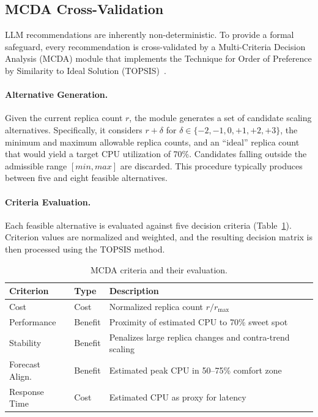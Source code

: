 \documentclass[sigconf]{acmart}
\begin{document}
\subsection{MCDA Cross-Validation}
\label{sec:mcda}

LLM recommendations are inherently non-deterministic.  To provide a formal safeguard, every recommendation is cross-validated by a Multi-Criteria Decision Analysis (MCDA) module that implements the Technique for Order of Preference by Similarity to Ideal Solution (TOPSIS)~\cite{hwang1981topsis}.

\paragraph{Alternative Generation.}
Given the current replica count $r$, the module generates a set of candidate scaling alternatives. Specifically, it considers $r + \delta$ for $\delta \in \{-2,-1,0,+1,+2,+3\}$, the minimum and maximum allowable replica counts, and an ``ideal'' replica count that would yield a target CPU utilization of 70\%. Candidates falling outside the admissible range $[\textit{min},\textit{max}]$ are discarded. This procedure typically produces between five and eight feasible alternatives.

\paragraph{Criteria Evaluation.}
Each feasible alternative is evaluated against five decision criteria (Table~\ref{tab:criteria}). Criterion values are normalized and weighted, and the resulting decision matrix is then processed using the TOPSIS method.


\begin{table}[t]
\caption{MCDA criteria and their evaluation.}
\label{tab:criteria}
\centering
\small
\begin{tabular}{@{}llp{3.8cm}@{}}
\toprule
\textbf{Criterion} & \textbf{Type} & \textbf{Description} \\
\midrule
Cost            & Cost    & Normalized replica count $r / r_{\max}$ \\
Performance     & Benefit & Proximity of estimated CPU to 70\% sweet spot \\
Stability       & Benefit & Penalizes large replica changes and contra-trend scaling \\
Forecast Align. & Benefit & Estimated peak CPU in 50--75\% comfort zone \\
Response Time   & Cost    & Estimated CPU as proxy for latency \\
\bottomrule
\end{tabular}
\end{table}
\end{document}
